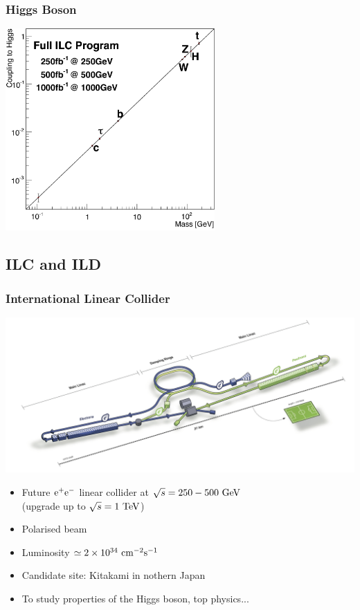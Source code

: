 \documentclass{beamer}
\begin{document}
    \begin{frame}
      \frametitle{Higgs Boson}

      \begin{center}
        \includegraphics[width = 0.6\textwidth]{Pictures/Chapter_Theory_figs_mass-coupling1TeV.png}
      \end{center}
     
    \end{frame}
    \subsection{ILC and ILD}

  \begin{frame}
    \frametitle{International Linear Collider}

    \vspace{-0.3cm}
    \begin{center}
      \includegraphics[width = 9 cm]{Pictures/ILC.png}
    \end{center}

    \vspace{-0.3cm}
    \begin{itemize}
      \item Future $\rm{e}^+\rm{e}^-$ linear collider at $\sqrt{s} = 250 - 500~\rm{GeV}$ \\ (upgrade up to $\sqrt{s} = 1~\rm{TeV}$)
      \item Polarised beam
      \item Luminosity $\simeq 2 \times 10^{34}~\rm{cm}^{-2}\rm{s}^{-1}$
      \item Candidate site: Kitakami in nothern Japan
      \item To study properties of the Higgs boson, top physics...
    \end{itemize}
  \end{frame}
 
\end{document}
